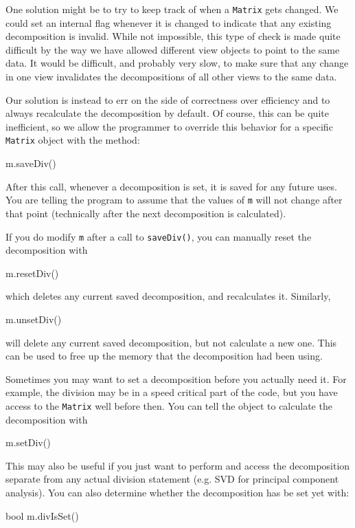 \documentclass[twoside,letterpaper,11pt]{article}
\renewcommand{\tt}[1]{{\lstinline {#1}}}
\begin{document}
One solution might be to try to keep track of when a \tt{Matrix} gets changed.  
We could set an
internal flag whenever it is changed to indicate that
any existing decomposition is invalid.  While not impossible,
this type of check is made
quite difficult by the way we have allowed different view objects to point to the same data.  
It would
be difficult, and probably very slow, to make sure that any change in one view invalidates the decompositions
of all other views to the same data.

Our solution is instead to err on the side of correctness over efficiency and
to always recalculate the decomposition by default.  Of course, this
can be quite inefficient, so we allow the programmer to override this
behavior for a specific \tt{Matrix} object with the method:
\begin{tmvcode}
m.saveDiv()
\end{tmvcode}
After this call, whenever a decomposition is set, it is saved for any future uses.
You are telling the program to assume that the values of \tt{m} will not change after 
that point (technically after
the next decomposition is calculated).
\label{matrixsetdiv}

If you do modify \tt{m} after a call to \tt{saveDiv()}, 
you can manually reset the decomposition with
\begin{tmvcode}
m.resetDiv()
\end{tmvcode}
which deletes any current saved decomposition, and recalculates it.
Similarly,
\begin{tmvcode}
m.unsetDiv()
\end{tmvcode}
will delete any current saved decomposition, but not calculate a new one.
This can be used to free up the memory that the decomposition had been using.

Sometimes you may want to set a decomposition before you actually need it.
For example, the division may be in a speed critical part of the code, but you have
access to the \tt{Matrix} well before then.  
You can tell the object to calculate the decomposition with
\begin{tmvcode}
m.setDiv()
\end{tmvcode}
This may also be useful if you just want to perform and access the decomposition
separate from any actual division statement (e.g. SVD for principal component analysis).
You can also determine whether the decomposition has be set yet with:
\begin{tmvcode}
bool m.divIsSet()
\end{tmvcode}
\end{document}
